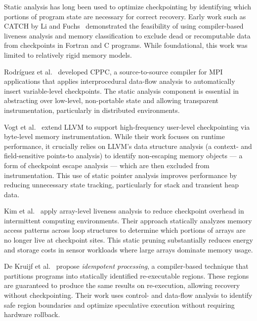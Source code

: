 Static analysis has long been used to optimize checkpointing by identifying which portions of program state are necessary for correct recovery. Early work such as CATCH by Li and Fuchs~\cite{li1990catch} demonstrated the feasibility of using compiler-based liveness analysis and memory classification to exclude dead or recomputable data from checkpoints in Fortran and C programs. While foundational, this work was limited to relatively rigid memory models.

Rodríguez et al.~\cite{rodriguez2010cppc} developed CPPC, a source-to-source compiler for MPI applications that applies interprocedural data-flow analysis to automatically insert variable-level checkpoints. The static analysis component is essential in abstracting over low-level, non-portable state and allowing transparent instrumentation, particularly in distributed environments.

Vogt et al.~\cite{vogt2015lightweight} extend LLVM to support high-frequency user-level checkpointing via byte-level memory instrumentation. While their work focuses on runtime performance, it crucially relies on LLVM's data structure analysis (a context- and field-sensitive points-to analysis) to identify non-escaping memory objects --- a form of checkpoint escape analysis --- which are then excluded from instrumentation. This use of static pointer analysis improves performance by reducing unnecessary state tracking, particularly for stack and transient heap data.

Kim et al.~\cite{kim2024lact} apply array-level liveness analysis to reduce checkpoint overhead in intermittent computing environments. Their approach statically analyzes memory access patterns across loop structures to determine which portions of arrays are no longer live at checkpoint sites. This static pruning substantially reduces energy and storage costs in sensor workloads where large arrays dominate memory usage.

De Kruijf et al.~\cite{de2012static} propose \textit{idempotent processing}, a compiler-based technique that partitions programs into statically identified re-executable regions. These regions are guaranteed to produce the same results on re-execution, allowing recovery without checkpointing. Their work uses control- and data-flow analysis to identify safe region boundaries and optimize speculative execution without requiring hardware rollback.

